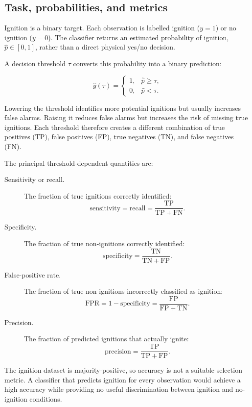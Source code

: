 \subsection{Task, probabilities, and metrics}

Ignition is a binary target. Each observation is labelled ignition
(\(y=1\)) or no ignition (\(y=0\)). The classifier returns an estimated
probability of ignition, \(\widehat p\in[0,1]\), rather than a direct physical
yes/no decision.

A decision threshold \(\tau\) converts this probability into a binary
prediction:

\[
\widehat y(\tau)=
\begin{cases}
1, & \widehat p\geq\tau,\\
0, & \widehat p<\tau.
\end{cases}
\]

Lowering the threshold identifies more potential ignitions but usually
increases false alarms. Raising it reduces false alarms but increases the risk
of missing true ignitions. Each threshold therefore creates a different
combination of true positives (TP), false positives (FP), true negatives (TN),
and false negatives (FN).

The principal threshold-dependent quantities are:

\begin{description}
  \item[Sensitivity or recall.]
  The fraction of true ignitions correctly identified:
  \[
  \mathrm{sensitivity}
  =\mathrm{recall}
  =\frac{\mathrm{TP}}{\mathrm{TP}+\mathrm{FN}}.
  \]

  \item[Specificity.]
  The fraction of true non-ignitions correctly identified:
  \[
  \mathrm{specificity}
  =\frac{\mathrm{TN}}{\mathrm{TN}+\mathrm{FP}}.
  \]

  \item[False-positive rate.]
  The fraction of true non-ignitions incorrectly classified as ignition:
  \[
  \mathrm{FPR}
  =1-\mathrm{specificity}
  =\frac{\mathrm{FP}}{\mathrm{FP}+\mathrm{TN}}.
  \]

  \item[Precision.]
  The fraction of predicted ignitions that actually ignite:
  \[
  \mathrm{precision}
  =\frac{\mathrm{TP}}{\mathrm{TP}+\mathrm{FP}}.
  \]
\end{description}

The ignition dataset is majority-positive, so accuracy is not a suitable
selection metric. A classifier that predicts ignition for every observation
would achieve a high accuracy while providing no useful discrimination between
ignition and no-ignition conditions.

